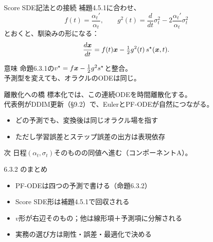 \asmain
\begin{frame}{Score SDE記法との接続}
    補題4.5.1に合わせ、
    \[
        f(t)=\frac{\alpha_t'}{\alpha_t},\qquad
        g^{2}(t)
        =
        \frac{d}{dt}\sigma_t^{2}
        -
        2\frac{\alpha_t'}{\alpha_t}\sigma_t^{2}
    \]
    とおくと、馴染みの形になる：
    \[
        \frac{d\bm{x}}{dt}
        =
        f(t)\bm{x} - \tfrac12 g^{2}(t)\, s^\star(\bm{x},t).
    \]
    \begin{exampleblock}{意味}
        命題6.3.1の$v^\star=f\bm{x}-\tfrac12 g^{2}s^\star$と整合。\\
        予測型を変えても、オラクルのODEは同じ。
    \end{exampleblock}
\end{frame}
\asmain
\begin{frame}{離散化への橋}
    標本化では、この連続ODEを時間離散化する。\\
    代表例がDDIM更新（§9.2）で、EulerとPF-ODEが自然につながる。
    \begin{itemize}
        \item どの予測でも、変換後は同じオラクル場を指す
        \item ただし学習誤差とステップ誤差の出方は表現依存
    \end{itemize}
    \begin{block}{次}
        日程$(\alpha_t,\sigma_t)$そのものの同値へ進む（コンポーネントA）。
    \end{block}
\end{frame}
\asmain
\begin{frame}{6.3.2 のまとめ}
    \begin{itemize}
        \item PF-ODEは四つの予測で書ける（命題6.3.2）
        \item Score SDE形は補題4.5.1で回収される
        \item $v$形が右辺そのもの；他は線形項＋予測項に分解される
        \item 実務の選び方は剛性・誤差・最適化で決める
    \end{itemize}
\end{frame}
